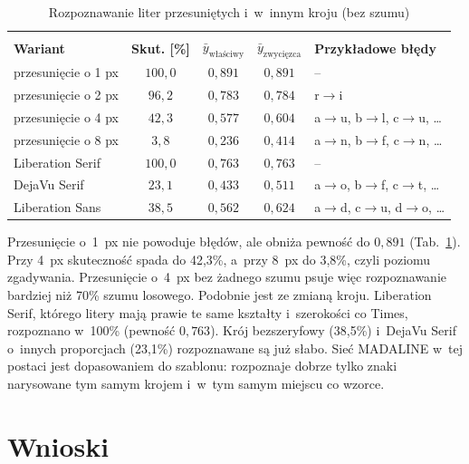 \documentclass[12pt]{article}
\begin{document}
\begin{table}[h!]
 \caption{Rozpoznawanie liter przesuniętych i~w~innym kroju (bez szumu)}
 \centering
 \setlength{\tabcolsep}{4pt}
 \small
 \vspace{0.2cm}
 \begin{tabular}{l c c c l}
  \hline\hline\\[-0.4cm]
  \textbf{Wariant} & \textbf{Skut. [\%]} & $\bar{y}_{\textrm{właściwy}}$ & $\bar{y}_{\textrm{zwycięzca}}$ & \textbf{Przykładowe błędy}\\[0.1cm]
  \hline
  przesunięcie o 1 px & $100{,}0$ & $0{,}891$ & $0{,}891$ & -- \\
  przesunięcie o 2 px & $96{,}2$ & $0{,}783$ & $0{,}784$ & r$\rightarrow$i \\
  przesunięcie o 4 px & $42{,}3$ & $0{,}577$ & $0{,}604$ & a$\rightarrow$u, b$\rightarrow$l, c$\rightarrow$u, \dots \\
  przesunięcie o 8 px & $3{,}8$ & $0{,}236$ & $0{,}414$ & a$\rightarrow$n, b$\rightarrow$f, c$\rightarrow$n, \dots \\
  Liberation Serif & $100{,}0$ & $0{,}763$ & $0{,}763$ & -- \\
  DejaVu Serif & $23{,}1$ & $0{,}433$ & $0{,}511$ & a$\rightarrow$o, b$\rightarrow$f, c$\rightarrow$t, \dots \\
  Liberation Sans & $38{,}5$ & $0{,}562$ & $0{,}624$ & a$\rightarrow$d, c$\rightarrow$u, d$\rightarrow$o, \dots \\
  \hline
 \end{tabular}
 \label{tab_rob}
\end{table}

\noindent Przesunięcie o~1~px nie powoduje błędów, ale obniża pewność do $0{,}891$
(Tab.~\ref{tab_rob}). Przy 4~px skuteczność spada do 42,3\%, a~przy 8~px do 3,8\%, czyli
poziomu zgadywania. Przesunięcie o~4~px bez żadnego szumu psuje więc rozpoznawanie bardziej
niż 70\% szumu losowego. Podobnie jest ze zmianą kroju. Liberation Serif, którego litery mają
prawie te same kształty i~szerokości co Times, rozpoznano w~100\% (pewność $0{,}763$).
Krój bezszeryfowy (38,5\%) i~DejaVu Serif o~innych proporcjach (23,1\%) rozpoznawane są już
słabo. Sieć MADALINE w~tej postaci jest dopasowaniem do szablonu: rozpoznaje dobrze tylko
znaki narysowane tym samym krojem i~w~tym samym miejscu co wzorce.

\section{Wnioski}
\end{document}

